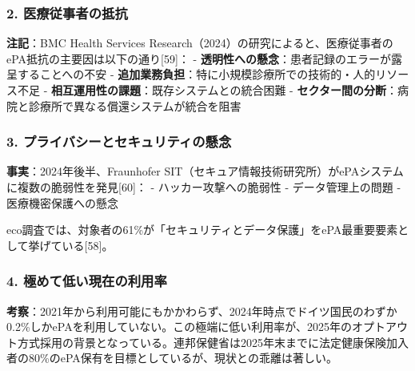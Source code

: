 \documentclass[
  a4paper,
  a4paper,
  11pt]{ltjsbook}
\begin{document}
\subsubsection{2.
医療従事者の抵抗}\label{ux533bux7642ux5f93ux4e8bux8005ux306eux62b5ux6297}

\begin{tcolorbox}[enhanced jigsaw, toprule=.15mm, bottomtitle=1mm, coltitle=black, left=2mm, opacityback=0, arc=.35mm, colbacktitle=quarto-callout-note-color!10!white, colback=white, opacitybacktitle=0.6, bottomrule=.15mm, rightrule=.15mm, breakable, title=\textcolor{quarto-callout-note-color}{\faInfo}\hspace{0.5em}{Note}, toptitle=1mm, titlerule=0mm, colframe=quarto-callout-note-color-frame, leftrule=.75mm]

\textbf{注記}：BMC Health Services
Research（2024）の研究によると、医療従事者のePA抵抗の主要因は以下の通り{[}59{]}：
- \textbf{透明性への懸念}：患者記録のエラーが露呈することへの不安 -
\textbf{追加業務負担}：特に小規模診療所での技術的・人的リソース不足 -
\textbf{相互運用性の課題}：既存システムとの統合困難 -
\textbf{セクター間の分断}：病院と診療所で異なる償還システムが統合を阻害

\end{tcolorbox}

\subsubsection{3.
プライバシーとセキュリティの懸念}\label{ux30d7ux30e9ux30a4ux30d0ux30b7ux30fcux3068ux30bbux30adux30e5ux30eaux30c6ux30a3ux306eux61f8ux5ff5}

\textbf{事実}：2024年後半、Fraunhofer
SIT（セキュア情報技術研究所）がePAシステムに複数の脆弱性を発見{[}60{]}：
- ハッカー攻撃への脆弱性 - データ管理上の問題 - 医療機密保護への懸念

eco調査では、対象者の61\%が「セキュリティとデータ保護」をePA最重要要素として挙げている{[}58{]}。

\subsubsection{4.
極めて低い現在の利用率}\label{ux6975ux3081ux3066ux4f4eux3044ux73feux5728ux306eux5229ux7528ux7387}

\textbf{考察}：2021年から利用可能にもかかわらず、2024年時点でドイツ国民のわずか0.2\%しかePAを利用していない。この極端に低い利用率が、2025年のオプトアウト方式採用の背景となっている。連邦保健省は2025年末までに法定健康保険加入者の80\%のePA保有を目標としているが、現状との乖離は著しい。
\end{document}
